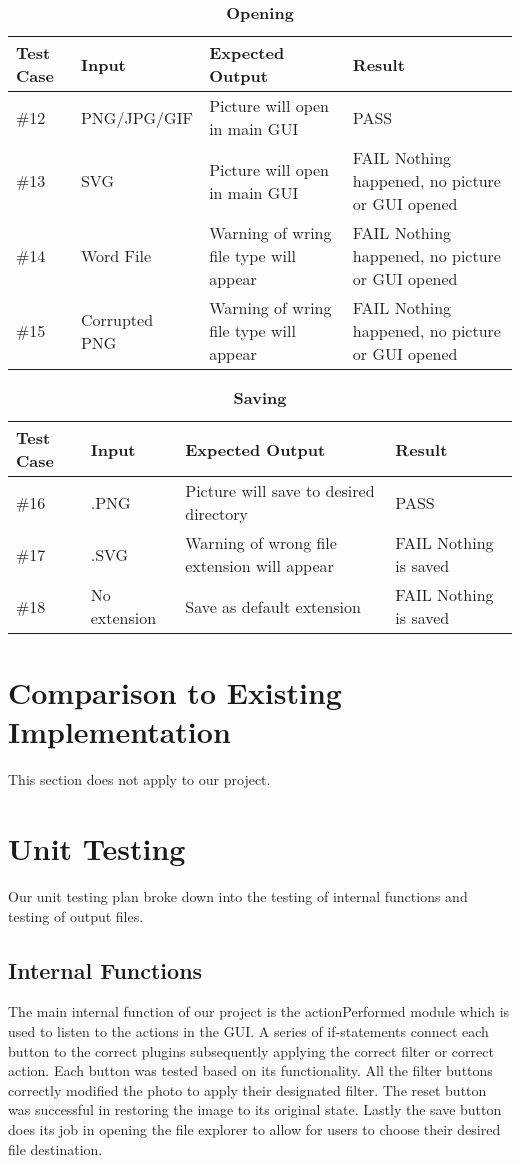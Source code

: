\documentclass[12pt, titlepage]{article}
\begin{document}
\begin{table}[!hb]
\scriptsize
\caption{\bf Opening}
\begin{tabu} to 1.1\textwidth { | X[.3] | X[.7] | X[.7] | X[.7] |}
\hline
	      		Test Case & Input & Expected Output & Result \\
\hline
\#12
& PNG/JPG/GIF
& Picture will open in main GUI
& PASS\\
\hline
\#13
& SVG
& Picture will open in main GUI
& FAIL Nothing happened, no picture or GUI opened\\
\hline
\#14
& Word File
& Warning of wring file type will appear
& FAIL Nothing happened, no picture or GUI opened\\
\hline
\#15
& Corrupted PNG
& Warning of wring file type will appear
& FAIL Nothing happened, no picture or GUI opened\\
\hline
	\end{tabu}
	\end{table}

\begin{table}[h]
\scriptsize
\caption{\bf Saving}
\begin{tabu} to 1.1\textwidth { | X[.3] | X[.7] | X[.7] | X[.7] |}
\hline
	      		Test Case & Input & Expected Output & Result \\
\hline
\#16
& .PNG
& Picture will save to desired directory
& PASS\\
\hline
\#17
& .SVG
& Warning of wrong file extension will appear
& FAIL Nothing is saved \\
\hline
\#18
& No extension
& Save as default extension
& FAIL Nothing is saved \\
\hline
	\end{tabu}
	\end{table}


\section{Comparison to Existing Implementation}	
This section does not apply to our project.

\section{Unit Testing}
Our unit testing plan broke down into the testing of internal functions and testing of output files.
\subsection{Internal Functions}
The main internal function of our project is the actionPerformed module which is used to listen to the actions in the GUI. A series of if-statements connect each button to the correct plugins subsequently applying the correct filter or correct action. Each button was tested based on its functionality. All the filter buttons correctly modified the photo to apply their designated filter. The reset button was successful in restoring the image to its original state. Lastly the save button does its job in opening the file explorer to allow for users to choose their desired file destination.
\end{document}
